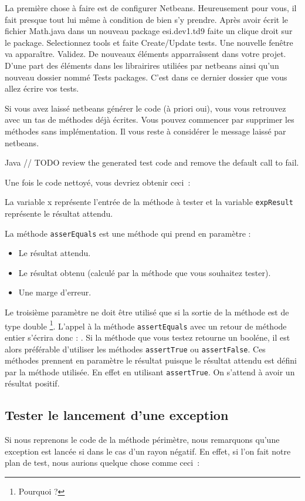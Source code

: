 \documentclass[a4paper,11pt]{article}
\begin{document}
	La première chose à faire est de configurer Netbeans. Heureusement pour vous, il fait presque tout lui même à condition de bien s’y prendre.
	Après avoir écrit le fichier Math.java dans un nouveau package esi.dev1.td9 faite un clique droit sur le package. Selectionnez tools et faite Create/Update tests. Une nouvelle fenêtre va apparaître. Validez. De nouveaux éléments apparraîssent dans votre
	projet. D’une part des éléments dans les librairires utiliées par netbeans ainsi qu’un nouveau dossier nommé Tests packages. C’est dans ce dernier dossier que vous allez écrire vos tests.

	Si vous avez laissé netbeans générer le code (à priori oui), vous vous retrouvez avec un tas de méthodes déjà écrites. Vous pouvez commencer par supprimer les méthodes sans implémentation.
	Il vous reste à considérer le message laissé par netbeans.
	\begin{Code}{Java}
		// TODO review the generated test code and remove the default call to fail.
	\end{Code}

	Une fois le code nettoyé, vous devriez obtenir ceci~:

	La variable x représente l’entrée de la méthode à tester et la variable \texttt{expResult} représente le résultat attendu.

	La méthode \texttt{asserEquals} est une méthode qui prend en paramètre :
	\begin{itemize}
		\item Le résultat attendu.
		\item Le résultat obtenu (calculé par la méthode que vous souhaitez tester).
		\item Une marge d’erreur.
	\end{itemize}

	Le troisième paramètre ne doit être utilisé que si la sortie de la méthode est de type double \footnote{Pourquoi ?}.
	L’appel à la méthode \texttt{assertEquals} avec un retour de méthode entier s’écrira donc :
	.
	Si la méthode que vous testez retourne un booléne, il est alors préférable d’utiliser les méthodes \texttt{assertTrue} ou \texttt{assertFalse}. Ces méthodes prennent en paramètre le résultat puisque le résultat attendu est défini par la méthode utilisée. En effet en utilisant \texttt{assertTrue}.
	On s’attend à avoir un résultat positif.

	\subsection{Tester le lancement d'une exception}
	Si nous reprenons le code de la méthode périmètre, nous remarquons qu'une exception est lancée si dans le cas d'un rayon négatif. En effet, si l'on fait notre plan de test, nous aurions quelque chose comme ceci~:
\end{document}
